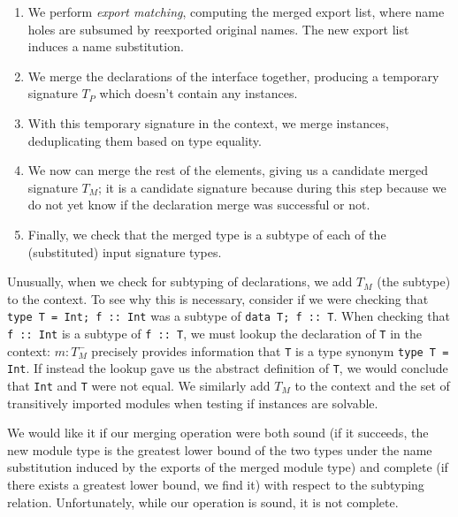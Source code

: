 \begin{enumerate}
    \item We perform \emph{export matching}, computing the merged
    export list, where name holes are subsumed by reexported original
    names. The new export list induces a name substitution.

    \item We merge the declarations of the interface together,
    producing a temporary signature $T_P$ which doesn't contain
    any instances.

    \item With this temporary signature in the context, we
    merge instances, deduplicating them based on type equality.

    \item We now can merge the rest of the elements, giving us
    a candidate merged signature $T_M$; it is a candidate signature
    because during this step because we do not yet know if the
    declaration merge was successful or not.

    \item Finally, we check that the merged type is a subtype of each of the
    (substituted) input signature types.
\end{enumerate}
Unusually, when we check for subtyping of declarations, we add $T_M$ (the subtype)
to the context.  To see why this is necessary, consider if we were
checking that \verb|type T = Int; f :: Int| was a subtype of \verb|data T; f :: T|.
When checking that \verb|f :: Int| is a subtype of \verb|f :: T|, we must lookup
the declaration of \verb|T| in the context: $m : T_M^-$ precisely provides
information that \verb|T| is a type synonym \verb|type T = Int|.  If
instead the lookup gave us the abstract definition of \verb|T|, we would conclude
that \verb|Int| and \verb|T| were not equal.  We similarly add $T_M$ to
the context and the set of transitively imported modules when testing if instances are solvable.


We would like it if our merging operation were both sound (if it
succeeds, the new module type is the greatest lower bound of the two
types under the name substitution induced by the exports of the merged
module type) and complete (if there exists a greatest lower bound, we
find it) with respect to the subtyping relation.  Unfortunately,
while our operation is sound, it is not complete.

